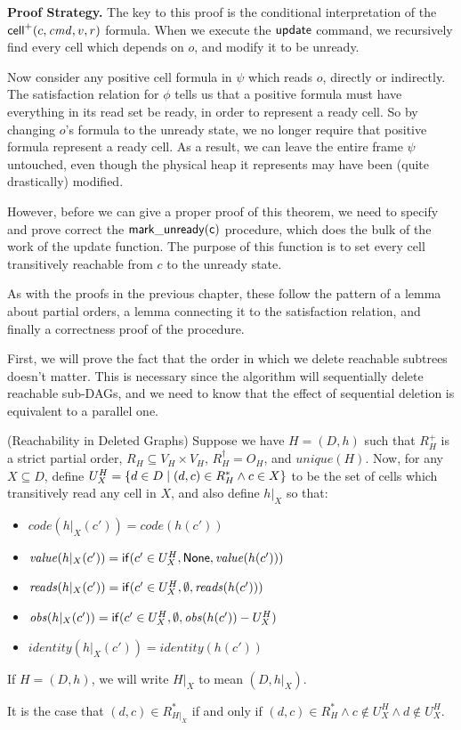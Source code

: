 \textbf{Proof Strategy.} The key to this proof is the conditional
interpretation of the $\mathsf{cell}^{+}({c}, {\mathit{cmd}}, {v}, {r})$ formula. When we execute
the $\mathsf{update}$ command, we recursively find every cell which
depends on $o$, and modify it to be unready.

Now consider any positive cell formula in $\psi$ which reads $o$,
directly or indirectly. The satisfaction relation for $\phi$ tells us
that a positive formula must have everything in its read set be ready,
in order to represent a ready cell. So by changing $o$'s formula to
the unready state, we no longer require that positive formula
represent a ready cell. As a result, we can leave the entire frame
$\psi$ untouched, even though the physical heap it represents may have
been (quite drastically) modified.

However, before we can give a proper proof of this theorem, we need to
specify and prove correct the $\mathsf{mark\_unready(c)}$ procedure,
which does the bulk of the work of the update function. The purpose of
this function is to set every cell transitively reachable from $c$ to
the unready state.

As with the proofs in the previous chapter, these follow the pattern 
of a lemma about partial orders, a lemma connecting it to the satisfaction
relation, and finally a correctness proof of the procedure. 

First, we will prove the fact that the order in which we delete
reachable subtrees doesn't matter. This is necessary since the 
algorithm will sequentially delete reachable sub-DAGs, and we
need to know that the effect of sequential deletion is equivalent
to a parallel one.  

\begin{lemma}{(Reachability in Deleted Graphs)}
Suppose we have $H = (D,h)$ such that $R^+_H$ is a strict partial
order, $R_H \subseteq V_H \times V_H$, $R^\dagger_H = O_H$, and
$\mathit{unique}(H)$.  Now, for any $X \subseteq D$, define $U^H_X =
\{{{d \in D}\;|\;{(d, c) \in R^*_H \land c \in X}}\}$ to be the set
of cells which transitively read any cell in $X$, and also define
$h|_X$ so that:
\begin{itemize}
\item $\mathit{code}(h|_X(c')) = \mathit{code}(h(c'))$
\item $\mathit{value}(h|_X(c')) = \mathsf{if}({c' \in U^H_X}, {\mathsf{None}}, {\mathit{value}(h(c'))})$
\item $\mathit{reads}(h|_X(c')) = \mathsf{if}({c' \in U^H_X}, {\emptyset}, {\mathit{reads}(h(c'))})$
\item $\mathit{obs}(h|_X(c')) = \mathsf{if}({c' \in U^H_X}, {\emptyset}, {\mathit{obs}(h(c')) - U^H_X})$
\item $\mathit{identity}(h|_X(c')) = \mathit{identity}(h(c'))$
\end{itemize}
If $H = (D,h)$, we will write $H|_X$ to mean $(D,h|_X)$. 

It is the case that $(d,c) \in R^*_{H|_X}$ if and only if $(d,c) \in R^*_H \land c \not\in U^H_X \land d \not\in U^H_X$. 
\end{lemma}

